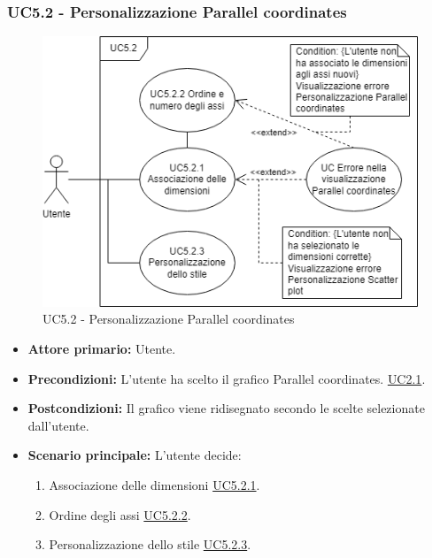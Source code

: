 \subsubsection{UC5.2 - Personalizzazione Parallel coordinates}
\label{sec:UC5.2}
\begin{figure}[h!]
	\centering
	\includegraphics[scale=0.55]{../../assets/personalizzazioneParallelCoordinates.drawio.png}
	\caption{UC5.2 - Personalizzazione Parallel coordinates}
\end{figure}
\begin{itemize}
    \item \textbf{Attore primario:} Utente.
	\item \textbf{Precondizioni:} L'utente ha scelto il grafico Parallel coordinates. \hyperref[sec:UC2.1]{UC2.1}.
	\item \textbf{Postcondizioni:} Il grafico viene ridisegnato secondo le scelte selezionate dall'utente.
	\item \textbf{Scenario principale:} L'utente decide:
	\begin{enumerate}
        \item Associazione delle dimensioni \hyperref[sec:UC5.2.1]{UC5.2.1}.
        \item Ordine degli assi \hyperref[sec:UC5.2.2]{UC5.2.2}.
        \item Personalizzazione dello stile \hyperref[sec:UC5.2.3]{UC5.2.3}.
    \end{enumerate}
\end{itemize}

